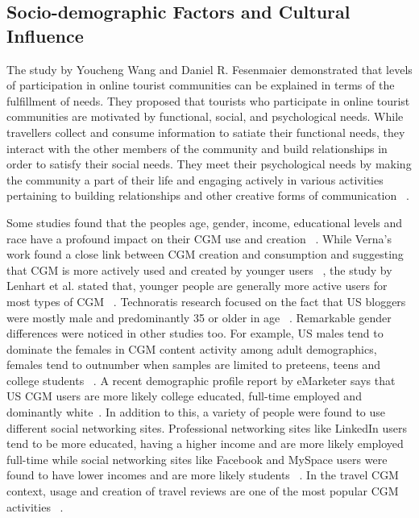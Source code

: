 \subsection{Socio-demographic Factors and Cultural Influence}

 

The study by Youcheng Wang and Daniel R. Fesenmaier demonstrated that levels of participation in online tourist communities can be explained in terms of the fulfillment of needs. They proposed that tourists who participate in online tourist communities are motivated by functional, social, and psychological needs. While travellers collect and consume information to satiate their functional needs, they interact with the other members of the community and build relationships in order to satisfy their social needs. They meet their psychological needs by making the community a part of their life and engaging actively in various activities pertaining to building relationships and other creative forms of communication ~\cite{wang2002defining}.

Some studies found that the people\textquotesingle s age, gender, income, educational levels and race have a profound impact on their CGM use and creation ~\cite{lenhart2008teens, verna2009user}. While Verna's work  found a close link between CGM creation and consumption and suggesting that CGM is more actively used and created by younger users ~\cite{verna2009user}, the study by Lenhart et al. stated that, younger people are generally more active users for most types of CGM ~\cite{lenhart2008teens}.  Technorati\textquotesingle s research focused on the fact that US bloggers were mostly male and predominantly 35 or older in age ~\cite{technorati2008}. Remarkable gender differences were noticed in other studies too. For example, US males tend to dominate the females in CGM content activity among adult demographics, females tend to outnumber when samples are limited to preteens, teens and college students ~\cite{verna2009user}. A recent demographic profile report by eMarketer says that US CGM users are more likely college educated, full-time employed and dominantly white~\cite{eMarketer2009}. In addition to this, a variety of people were found to use different social networking sites. Professional networking sites like LinkedIn users tend to be more educated, having a higher income and are more likely employed full-time while social networking sites like Facebook and MySpace users were found to have lower incomes and are more likely students ~\cite{eMarketer2009}. In the travel CGM context, usage and creation of travel reviews are one of the most popular CGM activities ~\cite{gretzel2007online}.
 

